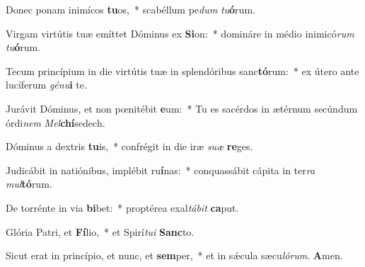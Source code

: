 \item Donec ponam inimícos \textbf{tu}os,~* scabéllum pe\textit{dum} \textit{tu}\textbf{ó}rum.

\item Virgam virtútis tuæ emíttet Dóminus ex \textbf{Si}on:~* domináre in médio inimicó\textit{rum} \textit{tu}\textbf{ó}rum.

\item Tecum princípium in die virtútis tuæ in splendóribus sanc\textbf{tó}rum:~* ex útero ante lucíferum \textit{gé}\textit{nu}\textbf{i} te.

\item Jurávit Dóminus, et non pœnitébit \textbf{e}um:~* Tu es sacérdos in ætérnum secúndum órdi\textit{nem} \textit{Mel}\textbf{chí}sedech.

\item Dóminus a dextris \textbf{tu}is,~* confrégit in die iræ \textit{su}\textit{æ} \textbf{re}ges.

\item Judicábit in natiónibus, implébit ru\textbf{í}nas:~* conquassábit cápita in ter\textit{ra} \textit{mul}\textbf{tó}rum.

\item De torrénte in via \textbf{bi}bet:~* proptérea exal\textit{tá}\textit{bit} \textbf{ca}put.

\item Glória Patri, et \textbf{Fí}lio,~* et Spirí\textit{tu}\textit{i} \textbf{Sanc}to.

\item Sicut erat in princípio, et nunc, et \textbf{sem}per,~* et in sǽcula sæcu\textit{ló}\textit{rum}. \textbf{A}men.

